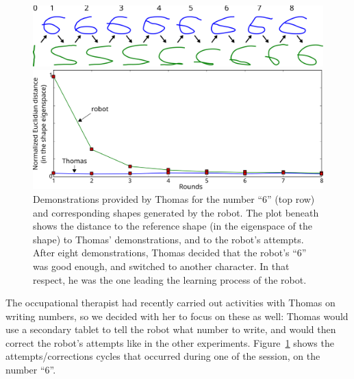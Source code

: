 \documentclass{article}
\begin{document}
\begin{figure}
    \centering
    \includegraphics[width=0.9\linewidth]{learning_6_demos}

    \vspace{1em}

    \includegraphics[width=0.7\linewidth]{learning_6_distances}
    \caption{\small Demonstrations provided by Thomas for the number ``6'' (top
        row) and corresponding shapes generated by the robot. The plot beneath
        shows the distance to the reference shape (in the eigenspace of the
        shape) to Thomas' demonstrations, and to the robot's attempts. After
        eight demonstrations, Thomas decided that the robot's ``6'' was good
        enough, and switched to another character. In that respect, he was the
        one leading the learning process of the robot.}

    \label{learning_6_demos}
\end{figure}


The occupational therapist had recently carried out activities with Thomas on
writing numbers, so we decided with her to focus on these as well: Thomas would
use a secondary tablet to tell the robot what number to write, and would then
correct the robot's attempts like in the other experiments.
Figure~\ref{learning_6_demos} shows the attempts/corrections cycles that
occurred during one of the session, on the number ``6''.

\end{document}
